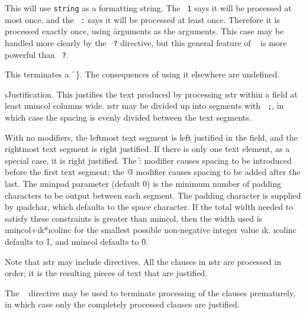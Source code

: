 This will use {\tt string} as a formatting string.  
The {\tt ~1\lbr } says it will                 
be processed at most once, and the {\tt ~:\rbr } 
says it will be processed at least once.
Therefore it is processed exactly once, using \f{arguments} as the arguments.
This case may be handled more clearly by the {\tt ~?} directive,
but this general feature of {\tt ~\lbr  }
is more powerful than {\tt ~?}.

\itemitem{\tt ~\rbr  }            
                               
This terminates a \f{~\}}.
The consequences of using it elsewhere are undefined.


\i{Justification}.
This justifies the text produced by processing \i{str}
within a field at least \i{mincol} columns wide.  \i{str}
may be divided up into segments with {\tt ~;}, in which case the
spacing is evenly divided between the text segments.

With no modifiers, the leftmost text segment is left justified in the
field, and the rightmost text segment is right justified.  If there is
only one text element, as a special case, it is right justified.
The \f{:} modifier causes                                            
spacing to be introduced before the first text segment;  the 
\f{@} modifier causes spacing to be added after the last.
The \i{minpad} parameter (default \f{0}) is the minimum number of
padding characters to be output between each segment.
The padding character is supplied by \i{padchar},
which defaults to the space character.
If the total width needed to satisfy these constraints is greater
than \i{mincol}, then the width used is \i{mincol}+\i{k}*\i{colinc}
for the smallest possible non-negative integer value \i{k}.
\i{colinc} defaults to \f{1}, and \i{mincol} defaults to \f{0}.

Note that \i{str} may include  directives.
All the clauses in \i{str} are processed in order;
it is the resulting pieces of text that are justified.

The {\tt ~\hat } directive may be used to terminate processing of the
clauses prematurely, in which case only the completely processed clauses
are justified.


